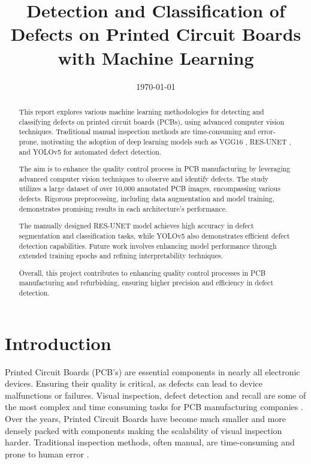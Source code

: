\documentclass[12pt]{article}
\title{Detection and Classification of Defects on Printed Circuit Boards with Machine Learning\\\phantom{.}}
\date{\today}
\begin{document}
\thispagestyle{empty}
\maketitle
\thispagestyle{empty}

\tableofcontents
\thispagestyle{empty}

\clearpage
\newpage

\vspace{2.5cm}

\begin{abstract}
This report explores various machine learning methodologies for detecting and classifying defects on printed circuit boards (PCBs), using advanced computer vision techniques. Traditional manual inspection methods are time-consuming and error-prone, motivating the adoption of deep learning models such as VGG16 \cite{VGG16GitHub}, RES-UNET \cite{Ashraf2022}, and YOLOv5 \cite{YOLOv5GitHub} for automated defect detection.

The aim is to enhance the quality control process in PCB manufacturing by leveraging advanced computer vision techniques to observe and identify defects. The study utilizes a large dataset of over 10,000 annotated PCB images, encompassing various defects. Rigorous preprocessing, including data augmentation and model training, demonstrates promising results in each architecture's performance.

The manually designed RES-UNET model achieves high accuracy in defect segmentation and classification tasks, while YOLOv5 also demonstrates efficient defect detection capabilities. Future work involves enhancing model performance through extended training epochs and refining interpretability techniques.

Overall, this project contributes to enhancing quality control processes in PCB manufacturing and refurbishing, ensuring higher precision and efficiency in defect detection.

\end{abstract}

\clearpage
\newpage

\section{Introduction}

Printed Circuit Boards (PCB's) are essential components in nearly all electronic devices. Ensuring their quality is critical, as defects can lead to device malfunctions or failures. Visual inspection, defect detection and recall are some of the most complex and time consuming tasks for PCB manufacturing companies \cite{wevolver_pcb_inspection}. Over the years, Printed Circuit Boards have become much smaller and more densely packed with components making the scalability of visual inspection harder. Traditional inspection methods, often manual, are time-consuming and prone to human error \cite{wevolver_pcb_inspection}.
\end{document}
